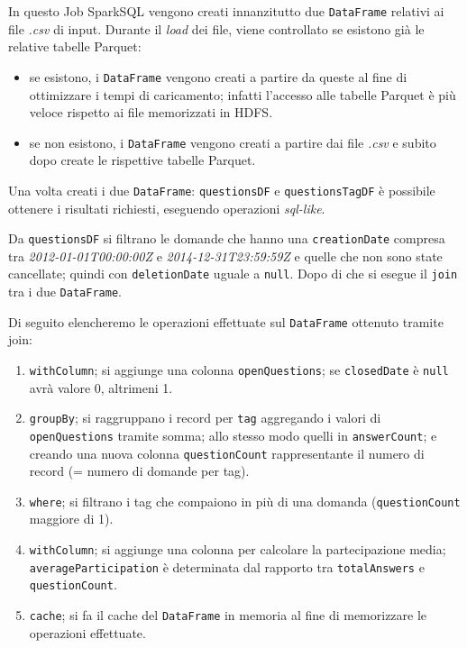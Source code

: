 \documentclass[10pt]{article}
\begin{document}
In questo Job SparkSQL vengono creati innanzitutto due \texttt{DataFrame} relativi ai file \textit{.csv} di input. Durante il \textit{load} dei file, viene controllato se esistono già le relative tabelle Parquet:
\begin{itemize}
    \item se esistono, i \texttt{DataFrame} vengono creati a partire da queste al fine di ottimizzare i tempi di caricamento; infatti l'accesso alle tabelle Parquet è più veloce rispetto ai file memorizzati in HDFS.
    \item se non esistono, i \texttt{DataFrame} vengono creati a partire dai file \textit{.csv} e subito dopo create le rispettive tabelle Parquet.
\end{itemize}

Una volta creati i due \texttt{DataFrame}: \texttt{questionsDF} e \texttt{questionsTagDF} è possibile ottenere i risultati richiesti, eseguendo operazioni \textit{sql-like}.

Da \texttt{questionsDF} si filtrano le domande che hanno una \texttt{creationDate} compresa tra \textit{2012-01-01T00:00:00Z} e \textit{2014-12-31T23:59:59Z} e quelle che non sono state cancellate; quindi con \texttt{deletionDate} uguale a \texttt{null}.
Dopo di che si esegue il \texttt{join} tra i due \texttt{DataFrame}.

Di seguito elencheremo le operazioni effettuate sul \texttt{DataFrame} ottenuto tramite join:
\begin{enumerate}
    \item \texttt{withColumn}; si aggiunge una colonna \texttt{openQuestions}; se \texttt{closedDate} è \texttt{null} avrà valore 0, altrimeni 1.
    \item \texttt{groupBy}; si raggruppano i record per \texttt{tag} aggregando i valori di \texttt{openQuestions} tramite somma; allo stesso modo quelli in \texttt{answerCount}; e creando una nuova colonna \texttt{questionCount} rappresentante il numero di record (= numero di domande per tag).
    \item \texttt{where}; si filtrano i tag che compaiono in più di una domanda (\texttt{questionCount} maggiore di 1).
    \item \texttt{withColumn}; si aggiunge una colonna per calcolare la partecipazione media; \texttt{averageParticipation} è determinata dal rapporto tra \texttt{totalAnswers} e \texttt{questionCount}.
    \item \texttt{cache}; si fa il cache del \texttt{DataFrame} in memoria al fine di memorizzare le operazioni effettuate.
\end{enumerate}
\end{document}
